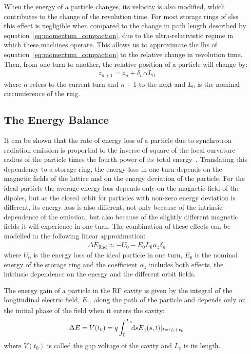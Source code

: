     When the energy of a particle changes, its velocity is also modified, which contributes to the change of the revolution time. For most storage rings of \gls{sls}s this effect is negligible when compared to the change in path length described by equation~\eqref{eq:momentum_compaction}, due to the ultra-relativistic regime in which these machines operate. This allows us to approximate the \gls{lhs} of equation~\eqref{eq:momentum_compaction} to the relative change in revolution time. Then, from one turn to another, the relative position of a particle will change by:
	\begin{align}\label{eq:revolution_time_variation}
		z_{n+1} = z_n + \delta_n\alpha L_0
	\end{align}
	where $n$ refers to the current turn and $n+1$ to the next and $L_0$ is the nominal circumference of the ring.

\subsection{The Energy Balance}

	It can be shown that the rate of energy loss of a particle due to synchrotron radiation emission is proportial to the inverse of square of the local curvature radius of the particle times the fourth power of its total energy~\cite[pp. 661: eq. 14.31]{Jackson1975}. Translating this dependency to a storage ring, the energy loss in one turn depends on the magnetic fields of the lattice and on the energy deviation of the particle. For the ideal particle the average energy loss depends only on the magnetic field of the dipoles, but as the closed orbit for particles with non-zero energy deviation is different, its energy loss is also different, not only because of the intrinsic dependence of the emission, but also because of the slightly different magnetic fields it will experience in one turn. The combination of these effects can be modelled in the following linear approximation:
	\begin{align}\label{eq:radiation_loss}
		\Delta E_\text{Rad} \approx -U_0 - E_0L_0\alpha_z\delta_n
	\end{align}
	where $U_0$ is the energy loss of the ideal particle in one turn, $E_0$ is the nominal energy of the storage ring and the coefficient $\alpha_z$ includes both effects, the intrinsic dependence on the energy and the different orbit fields.

	The energy gain of a particle in the RF cavity is given by the integral of the longitudinal electric field, $E_\parallel$, along the path of the particle and depends only on the initial phase of the field when it enters the cavity:
	\begin{align}
		\Delta E = V(t_0) = q\defint{s}{E_\parallel(s,t)|_{t=\sfrac{s}{c}+t_0}}{0}{L_c}
	\end{align}
	where $V(t_0)$ is called the gap voltage of the cavity and $L_c$ is its length.

